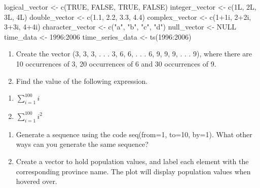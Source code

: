 \documentclass[
  letterpaper,
  DIV=11,
  numbers=noendperiod]{scrreprt}
\newenvironment{Shaded}{\begin{snugshade}}{\end{snugshade}}
\newcommand{\ConstantTok}[1]{\textcolor[rgb]{0.56,0.35,0.01}{#1}}
\newcommand{\DecValTok}[1]{\textcolor[rgb]{0.68,0.00,0.00}{#1}}
\newcommand{\FloatTok}[1]{\textcolor[rgb]{0.68,0.00,0.00}{#1}}
\newcommand{\FunctionTok}[1]{\textcolor[rgb]{0.28,0.35,0.67}{#1}}
\newcommand{\NormalTok}[1]{\textcolor[rgb]{0.00,0.23,0.31}{#1}}
\newcommand{\OtherTok}[1]{\textcolor[rgb]{0.00,0.23,0.31}{#1}}
\newcommand{\SpecialCharTok}[1]{\textcolor[rgb]{0.37,0.37,0.37}{#1}}
\newcommand{\StringTok}[1]{\textcolor[rgb]{0.13,0.47,0.30}{#1}}
\begin{document}
\begin{Shaded}
\begin{Highlighting}[]
\NormalTok{logical\_vector }\OtherTok{\textless{}{-}} \FunctionTok{c}\NormalTok{(}\ConstantTok{TRUE}\NormalTok{, }\ConstantTok{FALSE}\NormalTok{, }\ConstantTok{TRUE}\NormalTok{, }\ConstantTok{FALSE}\NormalTok{)}
\NormalTok{integer\_vector }\OtherTok{\textless{}{-}} \FunctionTok{c}\NormalTok{(1L, 2L, 3L, 4L)}
\NormalTok{double\_vector }\OtherTok{\textless{}{-}} \FunctionTok{c}\NormalTok{(}\FloatTok{1.1}\NormalTok{, }\FloatTok{2.2}\NormalTok{, }\FloatTok{3.3}\NormalTok{, }\FloatTok{4.4}\NormalTok{)}
\NormalTok{complex\_vector }\OtherTok{\textless{}{-}} \FunctionTok{c}\NormalTok{(}\DecValTok{1}\SpecialCharTok{+}\NormalTok{1i, }\DecValTok{2}\SpecialCharTok{+}\NormalTok{2i, }\DecValTok{3}\SpecialCharTok{+}\NormalTok{3i, }\DecValTok{4}\SpecialCharTok{+}\NormalTok{4i)}
\NormalTok{character\_vector }\OtherTok{\textless{}{-}} \FunctionTok{c}\NormalTok{(}\StringTok{"a"}\NormalTok{, }\StringTok{"b"}\NormalTok{, }\StringTok{"c"}\NormalTok{, }\StringTok{"d"}\NormalTok{)}
\NormalTok{null\_vector }\OtherTok{\textless{}{-}} \ConstantTok{NULL}
\NormalTok{time\_data }\OtherTok{\textless{}{-}} \DecValTok{1996}\SpecialCharTok{:}\DecValTok{2006}
\NormalTok{time\_series\_data }\OtherTok{\textless{}{-}} \FunctionTok{ts}\NormalTok{(}\DecValTok{1996}\SpecialCharTok{:}\DecValTok{2006}\NormalTok{)}
\end{Highlighting}
\end{Shaded}

\begin{enumerate}
\def\labelenumi{\arabic{enumi}.}
\setcounter{enumi}{2}
\item
  Create the vector (3, 3, 3, . . . 3, 6, 6, . . . 6, 9, 9, 9, . . . 9),
  where there are 10 occurrences of 3, 20 occurrences of 6 and 30
  occurrences of 9.
\item
  Find the value of the following expression.
\end{enumerate}

\begin{enumerate}
\def\labelenumi{\roman{enumi}.}
\item
  \(\sum_{i=1}^{100}i\)
\item
  \(\sum_{i=1}^{100}i^2\)
\end{enumerate}

\begin{enumerate}
\def\labelenumi{\arabic{enumi}.}
\setcounter{enumi}{4}
\item
  Generate a sequence using the code seq(from=1, to=10, by=1). What
  other ways can you generate the same sequence?
\item
  Create a vector to hold population values, and label each element with
  the corresponding province name. The plot will display population
  values when hovered over.
\end{enumerate}
\end{document}
